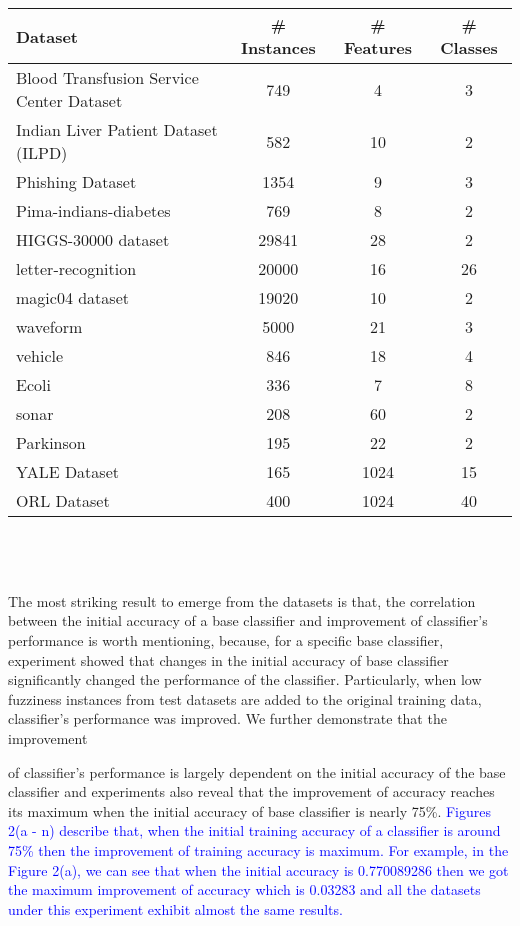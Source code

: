 \documentclass{article}
\begin{document}
		\textcolor{blue}{
		\begin{tabular}{l|c|c|c}
			\hline
			\textbf{Dataset} & \textbf{\# Instances} & \textbf{\# Features} & \textbf{\# Classes}\\
			\hline
			\hline
			Blood Transfusion Service Center Dataset & 749 & 4 & 3 \\
			\hline
			Indian Liver Patient Dataset (ILPD) & 582 & 10 & 2\\
			\hline
			Phishing Dataset & 1354 & 9 & 3\\
			\hline
			Pima-indians-diabetes & 769 & 8 & 2\\
			\hline
			HIGGS-30000 dataset & 29841 & 28 & 2\\
			\hline
			letter-recognition & 20000 & 16 & 26\\
			\hline
			magic04 dataset & 19020 & 10 & 2\\
			\hline
			waveform & 5000 & 21 & 3\\
			\hline
			vehicle & 846 & 18 & 4\\
			\hline
			Ecoli & 336 & 7 & 8\\
			\hline
			sonar & 208 & 60 & 2\\
			\hline
			Parkinson & 195  & 22 & 2\\
			\hline
			YALE Dataset & 165 & 1024 & 15\\
			\hline
			ORL Dataset & 400 & 1024 & 40\\
			\hline
		\end{tabular}
	}\\
	\\
	\\
	
	The most striking result to emerge from the datasets is that, the correlation between the initial accuracy of a base classifier and improvement of classifier’s performance is worth mentioning, because, for a specific base classifier, experiment showed that changes in the initial accuracy of base classifier significantly changed the performance of the classifier. Particularly, when low fuzziness instances from test datasets are added to the original training data, classifier’s performance was improved. We further demonstrate that the improvement
		
	
	
	\newpage
	of classifier’s performance is largely dependent on the initial accuracy of the base classifier and experiments
	also reveal that the improvement of accuracy reaches its maximum when the initial accuracy of base classifier
	is nearly 75\%. \textcolor{blue}{Figures 2(a - n) describe that, when the initial training accuracy of a classifier is around 75\% then the improvement of training accuracy is maximum. For example, in the Figure 2(a), we can see that when the initial accuracy is 0.770089286 then we got the maximum improvement of accuracy which is 0.03283 and all the datasets under this experiment exhibit almost the same results.} 
		
\end{document}
